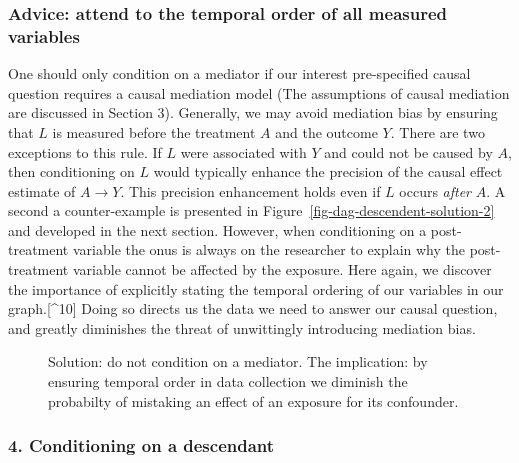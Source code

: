\documentclass[
  singlecolumn,
  9pt]{article}
\begin{document}
\subsubsection{Advice: attend to the temporal order of all measured
variables}\label{advice-attend-to-the-temporal-order-of-all-measured-variables-1}

One should only condition on a mediator if our interest pre-specified
causal question requires a causal mediation model (The assumptions of
causal mediation are discussed in Section 3). Generally, we may avoid
mediation bias by ensuring that \(L\) is measured before the treatment
\(A\) and the outcome \(Y\). There are two exceptions to this rule. If
\(L\) were associated with \(Y\) and could not be caused by \(A\), then
conditioning on \(L\) would typically enhance the precision of the
causal effect estimate of \(A \to Y\). This precision enhancement holds
even if \(L\) occurs \emph{after} \(A\). A second a counter-example is
presented in Figure~\ref{fig-dag-descendent-solution-2} and developed in
the next section. However, when conditioning on a post-treatment
variable the onus is always on the researcher to explain why the
post-treatment variable cannot be affected by the exposure. Here again,
we discover the importance of explicitly stating the temporal ordering
of our variables in our graph.{[}\^{}10{]} Doing so directs us the data
we need to answer our causal question, and greatly diminishes the threat
of unwittingly introducing mediation bias.

\begin{figure}


\caption{\label{fig-dag-mediator-solution}Solution: do not condition on
a mediator. The implication: by ensuring temporal order in data
collection we diminish the probabilty of mistaking an effect of an
exposure for its confounder.}

\end{figure}%

\subsubsection{4. Conditioning on a
descendant}\label{conditioning-on-a-descendant}
\end{document}
